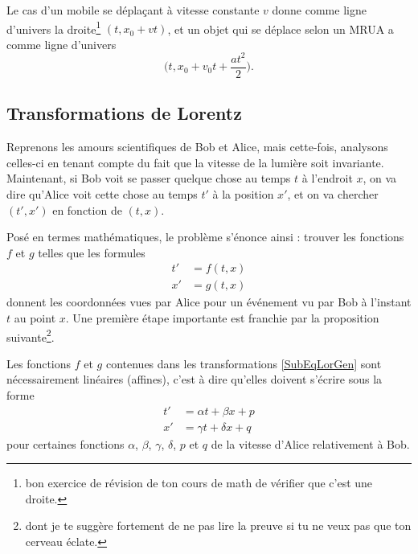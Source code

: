 Le cas d'un mobile se déplaçant à vitesse constante $v$ donne comme ligne d'univers la droite\footnote{bon exercice de révision de ton cours de math de vérifier que c'est une droite.} $(t,x_0+vt)$, et un objet qui se déplace selon un MRUA a comme ligne d'univers
\[ 
  \big( t, x_0+v_0t+\frac{ at^2 }{ 2 } \big).
\]

\subsection{Transformations de Lorentz}

Reprenons les amours scientifiques de Bob et Alice, mais cette-fois, analysons celles-ci en tenant compte du fait que la vitesse de la lumière soit invariante. Maintenant, si Bob voit se passer quelque chose au temps $t$ à l'endroit $x$, on va dire qu'Alice voit cette chose au temps $t'$ à la position $x'$, et on va chercher $(t',x')$ en fonction de $(t,x)$. 

Posé en termes mathématiques, le problème s'énonce ainsi : trouver les fonctions $f$ et $g$ telles que les formules
\begin{subequations}	\label{SubEqLorGen}
\begin{align}
	t'&=f(t,x)\\
	x'&=g(t,x)
\end{align}
\end{subequations}
donnent les coordonnées vues par Alice pour un événement vu par Bob à l'instant $t$ au point $x$. Une première étape importante est franchie par la proposition suivante\footnote{dont je te suggère fortement de ne pas lire la preuve si tu ne veux pas que ton cerveau éclate.}.

\begin{proposition}
Les fonctions $f$ et $g$ contenues dans les transformations \eqref{SubEqLorGen} sont nécessairement linéaires (affines), c'est à dire qu'elles doivent s'écrire sous la forme
\[ 
\begin{split}
t'&=\alpha t+\beta x+p	\\
x'&=\gamma t+\delta x+q
\end{split}  
\]
pour certaines fonctions $\alpha$, $\beta$, $\gamma$, $\delta$, $p$ et $q$ de la vitesse d'Alice relativement à Bob.
\end{proposition}

